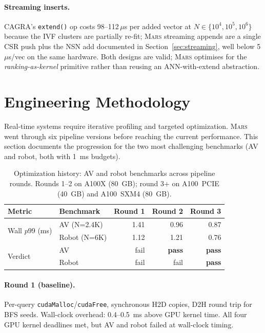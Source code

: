 \documentclass[11pt]{article}
\newcommand{\mars}{\textsc{Mars}}
\begin{document}
\paragraph{Streaming inserts.} CAGRA's \texttt{extend()} op
costs 98--112\,$\mu$s per added vector at $N{\in}\{10^4,10^5,10^6\}$
because the IVF clusters are partially re-fit; \mars{} streaming
appends are a single CSR push plus the NSN add documented in
Section~\ref{sec:streaming}, well below 5\,$\mu$s/vec on the same
hardware. Both designs are valid; \mars{} optimises for the
\emph{ranking-as-kernel} primitive rather than reusing an
ANN-with-extend abstraction.

\section{Engineering Methodology}
\label{sec:engineering}

Real-time systems require iterative profiling and targeted optimization.
\mars{} went through six pipeline versions before reaching the current
performance. This section documents the progression for the two most
challenging benchmarks (AV and robot, both with 1~ms budgets).

\begin{table}[ht]
\centering
\small
\caption{Optimization history: AV and robot benchmarks across pipeline
rounds. Rounds 1--2 on A100X (80~GB); round 3+ on A100~PCIE (40~GB) and
A100~SXM4 (80~GB).}
\label{tab:opt_history}
\begin{tabular}{llrrr}
\toprule
\textbf{Metric} & \textbf{Benchmark} & \textbf{Round 1} & \textbf{Round 2} & \textbf{Round 3} \\
\midrule
\multirow{2}{*}{Wall $p99$ (ms)}
  & AV (N=2.4K)   & 1.41 & 0.96 & 0.87 \\
  & Robot (N=6K)  & 1.12 & 1.21 & 0.76 \\
\midrule
\multirow{2}{*}{Verdict}
  & AV            & fail & \textbf{pass} & \textbf{pass} \\
  & Robot         & fail & fail & \textbf{pass} \\
\bottomrule
\end{tabular}
\end{table}

\paragraph{Round 1 (baseline).} Per-query
\texttt{cudaMalloc}/\texttt{cudaFree}, synchronous H2D copies, D2H
round trip for BFS seeds. Wall-clock overhead: 0.4--0.5~ms above GPU
kernel time. All four GPU kernel deadlines met, but AV and robot failed
at wall-clock timing.
\end{document}
